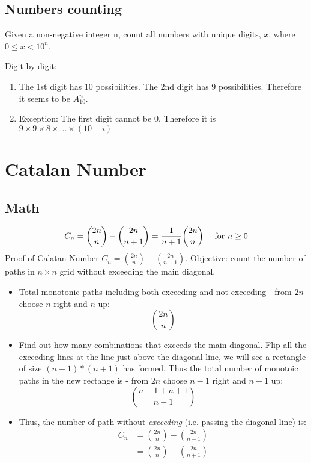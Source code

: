 \subsection{Numbers counting}
 Given a non-negative integer n, count all numbers with unique digits, $x$, where $0 \leq x < 10^n$.

Digit by digit: 
\begin{enumerate}
\item The 1st digit has 10 possibilities. The 2nd digit has 9 possibilities. Therefore it seems to be $A_{10}^n$.
\item Exception: The first digit cannot be 0. Therefore it is $9\times 9\times 8\times ...\times (10-i)$
\end{enumerate}



\section{Catalan Number}\label{section:catalanNumber}
\subsection{Math}
$$
C_n = {2n\choose n} - {2n\choose n+1} = {1\over n+1}{2n\choose n} \quad\text{ for }n\ge 0
$$
 Proof of Calatan Number $C_n ={2n\choose n} - {2n\choose n+1}$. Objective: count the number of paths in $n\times n$ grid without exceeding the main diagonal. 
\begin{itemize}
\begin{figure}[]
    \centerline{\texttt{[image: catalan\_proof]}}
    \caption{Monotonic Paths}
  \label{fig:catalanProof}
\end{figure}
\item Total monotonic paths including both exceeding and not exceeding - from $2n$ choose $n$ right and $n$ up:
$$
{2n\choose n}
$$
\item Find out how many combinations that exceeds the main diagonal. Flip all the exceeding lines at the line just above the diagonal line, we will see a rectangle of size $(n-1) * (n+1)$ has formed. Thus the total number of monotoic paths in the new rectange is - from $2n$ choose $n-1$ right and $n+1$ up:
$$
{n-1+n+1\choose n-1}
$$
\item Thus, the number of path without \textit{exceeding} (i.e. passing the diagonal line) is: 
\begin{align*}
C_n &= {2n\choose n} - {2n\choose n-1}\\ 
&={2n\choose n} - {2n\choose n+1}
\end{align*}
\end{itemize}


